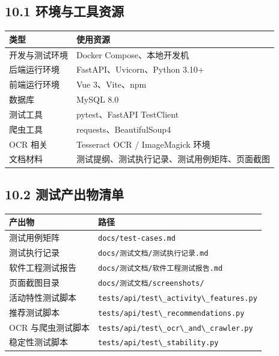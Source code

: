 \subsection{10.1
环境与工具资源}\label{ux73afux5883ux4e0eux5de5ux5177ux8d44ux6e90}

{\def\LTcaptype{none} %
\begin{longtable}[]{@{}|l|l|@{}}
\hline
\rowcolor{gray!12}
类型 & 使用资源 \\
\hline
\endhead
\hline
\endlastfoot
开发与测试环境 & Docker Compose、本地开发机 \\
\hline
后端运行环境 & FastAPI、Uvicorn、Python 3.10+ \\
\hline
前端运行环境 & Vue 3、Vite、npm \\
\hline
数据库 & MySQL 8.0 \\
\hline
测试工具 & pytest、FastAPI TestClient \\
\hline
爬虫工具 & requests、BeautifulSoup4 \\
\hline
OCR 相关 & Tesseract OCR / ImageMagick 环境 \\
\hline
文档材料 & 测试提纲、测试执行记录、测试用例矩阵、页面截图 \\
\hline
\end{longtable}
}

\subsection{10.2
测试产出物清单}\label{ux6d4bux8bd5ux4ea7ux51faux7269ux6e05ux5355}

{\def\LTcaptype{none} %
\begin{longtable}[]{@{}|l|l|@{}}
\hline
\rowcolor{gray!12}
产出物 & 路径 \\
\hline
\endhead
\hline
\endlastfoot
测试用例矩阵 & \passthrough{\lstinline!docs/test-cases.md!} \\
\hline
测试执行记录 &
\passthrough{\lstinline!docs/测试文档/测试执行记录.md!} \\
\hline
软件工程测试报告 &
\passthrough{\lstinline!docs/测试文档/软件工程测试报告.md!} \\
\hline
页面截图目录 & \passthrough{\lstinline!docs/测试文档/screenshots/!} \\
\hline
活动特性测试脚本 &
\passthrough{\lstinline!tests/api/test\_activity\_features.py!} \\
\hline
推荐测试脚本 &
\passthrough{\lstinline!tests/api/test\_recommendations.py!} \\
\hline
OCR 与爬虫测试脚本 &
\passthrough{\lstinline!tests/api/test\_ocr\_and\_crawler.py!} \\
\hline
稳定性测试脚本 &
\passthrough{\lstinline!tests/api/test\_stability.py!} \\
\hline
\end{longtable}
}

